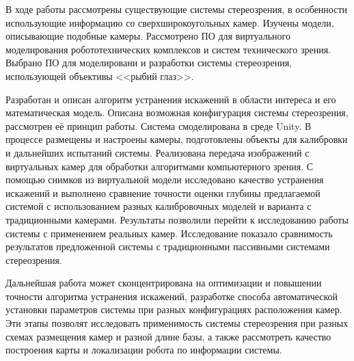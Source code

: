 
В ходе работы рассмотрены существующие системы стереозрения, в особенности использующие информацию
со сверхширокоугольных камер. Изучены модели, описывающие подобные камеры. Рассмотрено ПО для виртуального
 моделирования робототехнических комплексов и систем технического зрения. Выбрано ПО для моделировани и 
разработки системы стереозрения, использующей объективы <<рыбий глаз>>. 

Разработан и описан алгоритм устранения искажений в области интереса и его математическая модель.   %
Описана возможная конфигурация системы стереозрения, рассмотрен её принцип работы. Система 
 смоделирована в среде Unity. В процессе размещены и настроены камеры, подготовлены объекты для калибровки и 
дальнейших испытаний системы. Реализована передача изображений с виртуальных камер для обработки алгоритмами
компьютерного зрения. С помощью снимков из виртуальной модели исследовано качество устранения искажений и выполнено
 сравнение точности оценки глубины предлагаемой системой с использованием разных калибровочных моделей и варианта
с традиционными камерами. Результаты позволили перейти к исследованию работы системы с применением реальных камер.  
Исследование показало сравнимость результатов предложенной системы с традиционными пассивными системами стереозрения. %

Дальнейшая работа может сконцентрирована на оптимизации и повышении точности алгоритма устранения искажений,
разработке способа автоматической установки параметров системы при разных конфигурациях расположения камер. 
Эти этапы позволят исследовать применимость системы стереозрения при  разных схемах размещения камер и разной 
длине базы, а также рассмотреть качество построения карты и локализации робота по информации системы. 